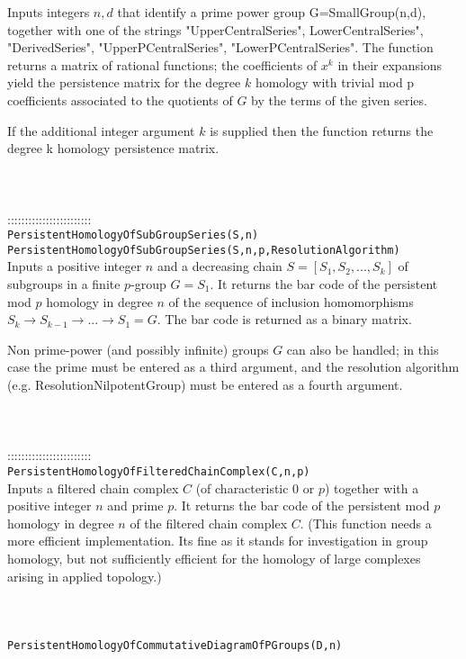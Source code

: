 \documentclass[a4paper,11pt]{report}
\begin{document}
{ Inputs integers $n,d$ that identify a prime power group G=SmallGroup(n,d), together with one of the
strings "UpperCentralSeries", LowerCentralSeries", "DerivedSeries",
"UpperPCentralSeries", "LowerPCentralSeries". The function returns a matrix of
rational functions; the coefficients of $x^k$ in their expansions yield the persistence matrix for the degree $k$ homology with trivial mod p coefficients associated to the quotients of $G$ by the terms of the given series. 

 If the additional integer argument $k$ is supplied then the function returns the degree k homology persistence
matrix. \\
 \\
 \\
 \\
 ::::::::::::::::::::::::\\
 \texttt{PersistentHomologyOfSubGroupSeries(S,n)}\\
 \texttt{PersistentHomologyOfSubGroupSeries(S,n,p,Resolution{\textunderscore}Algorithm)}\\
 

 Inputs a positive integer $n$ and a decreasing chain $S=[S_1, S_2, ..., S_k]$ of subgroups in a finite $p$-group $G=S_1$. It returns the bar code of the persistent mod $p$ homology in degree $n$ of the sequence of inclusion homomorphisms $S_k \rightarrow S_{k-1} \rightarrow ... \rightarrow S_1=G $. The bar code is returned as a binary matrix. 

 Non prime-power (and possibly infinite) groups $G$ can also be handled; in this case the prime must be entered as a third
argument, and the resolution algorithm (e.g. ResolutionNilpotentGroup) must be
entered as a fourth argument. \\
 \\
 \\
 \\
 ::::::::::::::::::::::::\\
 \texttt{PersistentHomologyOfFilteredChainComplex(C,n,p) }\\
 

 Inputs a filtered chain complex $C$ (of characteristic $0$ or $p$) together with a positive integer $n$ and prime $p$. It returns the bar code of the persistent mod $p$ homology in degree $n$ of the filtered chain complex $C$. (This function needs a more efficient implementation. Its fine as it stands
for investigation in group homology, but not sufficiently efficient for the
homology of large complexes arising in applied topology.) \\
 \\
 \\
 \\
 \texttt{PersistentHomologyOfCommutativeDiagramOfPGroups(D,n) }\\
 

}
\end{document}
